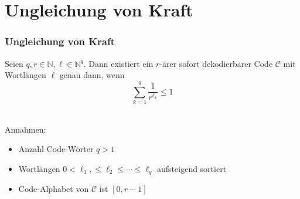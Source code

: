 \documentclass{beamer}
\begin{document}
\section{Ungleichung von Kraft}
\begin{frame}
    \frametitle{Ungleichung von Kraft}
    Seien $q,r \in \mathbb{N}, \ell \in \mathbb{N}^q$. Dann existiert ein $r$-ärer sofort dekodierbarer Code $\mathcal{C}$
    mit Wortlängen $\ell$ genau dann, wenn
    $$
        \sum_{k=1}^{q} \frac{1}{r^{\ell_k}} \leq 1
    $$\\[20pt]
    \pause

    Annahmen:

    \begin{itemize}
        \setlength\itemsep{1em}
        \item Anzahl Code-Wörter $q > 1$
        \pause
        \item Wortlängen $0 < \ell_1, \leq \ell_2 \leq \cdots \leq \ell_q$
            aufsteigend sortiert
        \pause
        \item Code-Alphabet von $\mathcal{C}$ ist $[0,r-1]$
    \end{itemize}
\end{frame}
\end{document}
